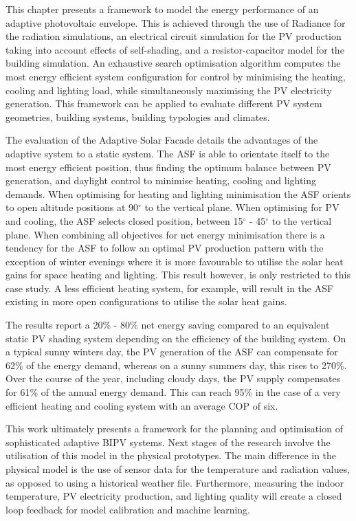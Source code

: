 
This chapter presents a framework to model the energy performance of an adaptive photovoltaic envelope. This is achieved through the use of Radiance for the radiation simulations, an electrical circuit simulation for the PV production taking into account effects of self-shading, and a resistor-capacitor model for the building simulation. An exhaustive search optimisation algorithm computes the most energy efficient system configuration for control by minimising the heating, cooling and lighting load, while simultaneously maximising the PV electricity generation. This framework can be applied to evaluate different PV system geometries, building systems, building typologies and climates.

The evaluation of the Adaptive Solar Facade details the advantages of the adaptive system to a static system. The ASF is able to orientate itself to the most energy efficient position, thus finding the optimum balance between PV generation, and daylight control to minimise heating, cooling and lighting demands. When optimising for heating and lighting minimisation the ASF orients to open altitude positions at 90$^{\circ}$ to the vertical plane. When optimising for PV and cooling, the ASF selects closed position, between 15$^{\circ}$ - 45$^{\circ}$ to the vertical plane. When combining all objectives for net energy minimisation there is a tendency for the ASF to follow an optimal PV production pattern with the exception of winter evenings where it is more favourable to utilise the solar heat gains for space heating and lighting. This result however, is only restricted to this case study. A less efficient heating system, for example, will result in the ASF existing in more open configurations to utilise the solar heat gains.


The results report a 20\% - 80\% net energy saving compared to an equivalent static PV shading system depending on the efficiency of the building system. On a typical sunny winters day, the PV generation of the ASF can compensate for 62\% of the energy demand, whereas on a sunny summers day, this rises to 270\%. Over the course of the year, including cloudy days, the PV supply compensates for 61\% of the annual energy demand. This can reach 95\% in the case of a very efficient heating and cooling system with an average COP of six.

This work ultimately presents a framework for the planning and optimisation of sophisticated adaptive BIPV systems. Next stages of the research involve the utilisation of this model in the physical prototypes. The main difference in the physical model is the use of sensor data for the temperature and radiation values, as opposed to using a historical weather file. Furthermore, measuring the indoor temperature, PV electricity production, and lighting quality will create a closed loop feedback for model calibration and machine learning. 






